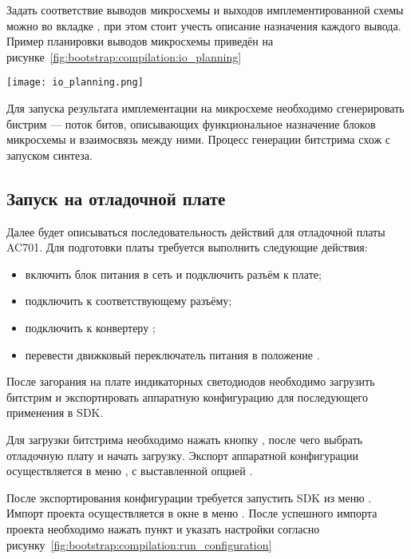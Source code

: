 Задать соответствие выводов микросхемы и выходов имплементированной схемы можно во вкладке ,
при этом стоит учесть описание назначения каждого вывода. Пример планировки выводов микросхемы
приведён на рисунке~\ref{fig:bootstrap:compilation:io_planning}

\begin{center}
  \centering
  \texttt{[image: io\_planning.png]}
  \label{fig:bootstrap:compilation:io_planning}
\end{center}

Для запуска результата имплементации на микросхеме необходимо сгенерировать бистрим ---
поток битов, описывающих функциональное назначение блоков микросхемы и взаимосвязь
между ними. Процесс генерации битстрима схож с запуском синтеза.

\subsection{Запуск на отладочной плате}
\label{sec:bootstrap:board}

Далее будет описываться последовательность действий для отладочной платы
AC701. Для подготовки платы требуется выполнить следующие действия:
\begin{itemize}
  \item включить блок питания в сеть и подключить разъём к плате;
  \item подключить  к соответствующему разъёму;
  \item подключить  к конвертеру ;
  \item перевести движковый переключатель питания в положение .
\end{itemize}

После загорания на плате индикаторных светодиодов необходимо загрузить
битстрим и экспортировать аппаратную конфигурацию для последующего
применения в SDK.

Для загрузки битстрима необходимо нажать кнопку ,
после чего выбрать отладочную плату и начать загрузку. Экспорт
аппаратной конфигурации осуществляется в меню ,
с выставленной опцией .

После экспортирования конфигурации требуется запустить SDK из меню .
Импорт проекта осуществляется в окне  в меню .
После успешного импорта проекта необходимо нажать пункт  и
указать настройки согласно рисунку~\ref{fig:bootstrap:compilation:run_configuration}

